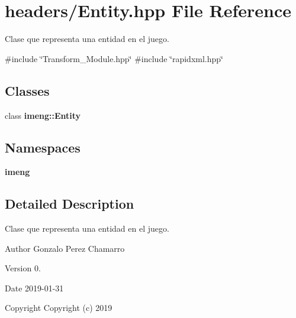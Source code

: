 \section{headers/\+Entity.hpp File Reference}
\label{_entity_8hpp}


Clase que representa una entidad en el juego.  


{\ttfamily \#include \char`\"{}Transform\+\_\+\+Module.\+hpp\char`\"{}}\newline
{\ttfamily \#include \char`\"{}rapidxml.\+hpp\char`\"{}}\newline
\subsection*{Classes}
\begin{DoxyCompactItemize}
\item 
class \textbf{ imeng\+::\+Entity}
\end{DoxyCompactItemize}
\subsection*{Namespaces}
\begin{DoxyCompactItemize}
\item 
 \textbf{ imeng}
\end{DoxyCompactItemize}


\subsection{Detailed Description}
Clase que representa una entidad en el juego. 

\begin{DoxyAuthor}{Author}
Gonzalo Perez Chamarro 
\end{DoxyAuthor}
\begin{DoxyVersion}{Version}
0. 
\end{DoxyVersion}
\begin{DoxyDate}{Date}
2019-\/01-\/31
\end{DoxyDate}
\begin{DoxyCopyright}{Copyright}
Copyright (c) 2019 
\end{DoxyCopyright}
